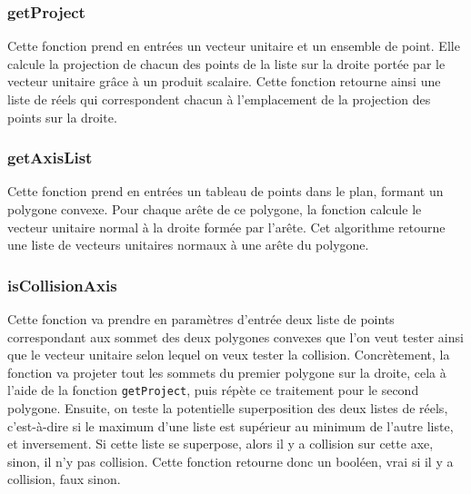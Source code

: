 \documentclass[11pt, final]{report}
\renewcommand{\tt}[1]{\texttt{#1}}
\begin{document}
\subsubsection{getProject}



Cette fonction prend en entrées un vecteur unitaire et un ensemble de point. Elle calcule la projection de chacun des points de la liste sur la droite portée par le vecteur unitaire grâce à un produit scalaire. Cette fonction retourne ainsi une liste de réels qui correspondent chacun à l'emplacement de la projection des points sur la droite. 
\\

\subsubsection{getAxisList}



Cette fonction prend en entrées un tableau de points dans le plan, formant un polygone convexe. 
Pour chaque arête de ce polygone, la fonction calcule le vecteur unitaire normal à la droite formée par l'arête. 
Cet algorithme retourne une liste de vecteurs unitaires normaux à une arête du polygone.
\\

\subsubsection{isCollisionAxis}



Cette fonction va prendre en paramètres d'entrée deux liste de points correspondant aux sommet des deux polygones convexes que l'on veut tester ainsi que le vecteur unitaire selon lequel on veux tester la collision. Concrètement, la fonction va projeter tout les sommets du premier polygone sur la droite, cela à l'aide de la fonction \tt{getProject}, puis répète ce traitement pour le second polygone. Ensuite, on teste la potentielle superposition des deux listes de réels, c'est-à-dire si le maximum d'une liste est supérieur au minimum de l'autre liste, et inversement. 
Si cette liste se superpose, alors il y a collision sur cette axe, sinon, il n'y pas collision.
Cette fonction retourne donc un booléen, vrai si il y a collision, faux sinon.
\\
\end{document}
